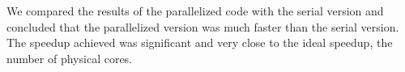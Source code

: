 \documentclass{article}
\begin{document}
We compared the results of the parallelized code with the serial version and 
concluded that the parallelized version was much faster than the serial version. 
The speedup achieved was significant and very close to the ideal speedup, the number of 
physical cores.

\newpage



% 

\end{document}
